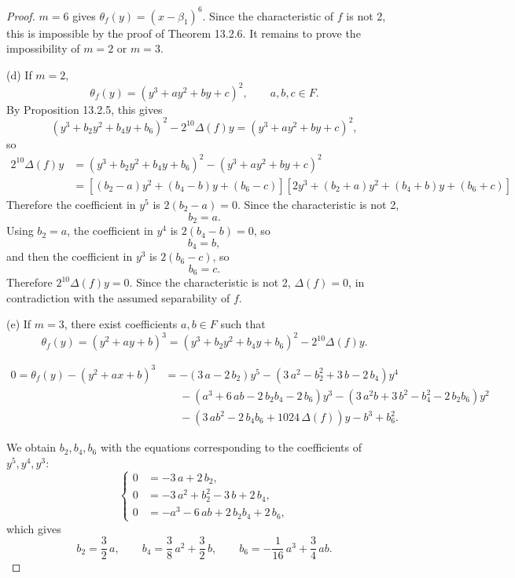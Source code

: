 \documentclass[11pt,a4paper]{article}
\begin{document}
\begin{proof}
$m=6$ gives $\theta_f(y) = (x-\beta_1)^6$. Since the characteristic of $f$ is not 2, this is impossible by the proof of Theorem 13.2.6. It remains to prove the impossibility of $m=2$ or $m=3$.


\item[(d)] If $m=2$,
$$\theta_f(y) = (y^3+ay^2+by+c)^2,\qquad a,b,c \in F.$$
By Proposition 13.2.5, this gives
$$(y^3+b_2y^2+b_4y+b_6)^2-2^{10} \Delta(f) y=(y^3+ay^2+by+c)^2,$$
so
\begin{align*}
2^{10} \Delta(f) y &= (y^3+b_2y^2+b_4y+b_6)^2 - (y^3+ay^2+by+c)^2\\
&=[(b_2-a)y^2 + (b_4 -b)y + (b_6-c)] [2y^3 + (b_2+a)y^2 + (b_4+b)y + (b_6+c)]
\end{align*}
Therefore the coefficient in $y^5$ is $2(b_2-a) = 0$. Since the characteristic is not 2,
$$b_2 = a.$$
Using $b_2 = a$, the coefficient in $y^4$ is $2(b_4-b) = 0$, so
$$b_4 = b,$$
and then the coefficient in $y^3$ is $2(b_6-c)$, so
$$b_6 = c.$$
Therefore $2^{10} \Delta(f) y = 0$. Since the characteristic is not 2, $\Delta(f) = 0$, in contradiction with the assumed separability of $f$.

\item[(e)] If $m=3$, there exist coefficients $a,b \in F$ such that
$$\theta_f(y) = (y^2+ay+b)^3 = (y^3 +b_2y^2+b_4y+b_6)^2 - 2^{10} \Delta(f) y. $$ 


\begin{align*}
0 = \theta_f(y) - (y^2+ax+b)^3 &= -{\left(3 \, a - 2 \, b_{2}\right)} y^{5} - {\left(3 \, a^{2} -
b_{2}^{2} + 3 \, b - 2 \, b_{4}\right)} y^{4}\\
&\phantom{ = } - {\left(a^{3} + 6 \, a b
- 2 \, b_{2} b_{4} - 2 \, b_{6}\right)} y^{3}  - {\left(3 \,
a^{2} b + 3 \, b^{2} - b_{4}^{2} - 2 \, b_{2} b_{6}\right)} y^{2}\\
&\phantom{ = }  - {\left(3 \, a b^{2} - 2 \, b_{4} b_{6} + 1024 \,
\Delta(f)\right)} y - b^{3} +b_{6}^{2}.
\end{align*}

We obtain $b_2,b_4,b_6$ with the equations corresponding to the coefficients of $y^5,y^4,y^3$:
$$
\left\{
\begin{array}{lll}
0 &= -3 \, a + 2 \, b_{2},\\
 0&=-3 \, a^{2} +b_{2}^{2} - 3 \, b + 2 \, b_{4},\\
0&= -a^{3} - 6 \, a b + 2 \, b_{2} b_{4} + 2 \, b_{6},
\end{array}
\right.
$$
which gives
$$b_{2} = \frac{3}{2} \, a, \qquad b_{4} = \frac{3}{8} \, a^{2} +
\frac{3}{2} \, b, \qquad b_{6} = -\frac{1}{16} \, a^{3} + \frac{3}{4} \, ab.$$


\end{proof}
\end{document}
